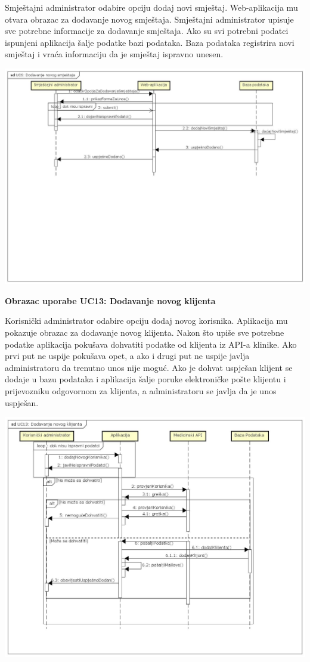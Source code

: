 			Smještajni administrator odabire opciju dodaj novi smještaj. Web-aplikacija mu otvara obrazac za dodavanje novog smještaja. Smještajni administrator upisuje sve potrebne informacije za dodavanje smještaja. Ako su svi potrebni podatci ispunjeni aplikacija šalje podatke bazi podataka. Baza podataka registrira novi smještaj i vraća informaciju da je smještaj ispravno unesen.
			{
			\begin{center} 
			\includegraphics[scale=0.32]{./dijagrami/sec_uc6}
			\end{center}
			}
			\eject
			
						
			\textbf{Obrazac uporabe UC13: Dodavanje novog klijenta}
			
			Korisnički administrator odabire opciju dodaj novog korisnika. Aplikacija mu pokazuje obrazac za dodavanje novog klijenta. Nakon što upiše sve potrebne podatke aplikacija pokušava dohvatiti podatke od klijenta iz API-a klinike. Ako prvi put ne uspije pokušava opet, a ako i drugi put ne uspije javlja administratoru da trenutno unos nije moguć. Ako je dohvat uspješan klijent se dodaje u bazu podataka i aplikacija šalje poruke elektroničke pošte klijentu i prijevozniku odgovornom za klijenta, a administratoru se javlja da je unos uspješan.
			{
			\begin{center}
			\includegraphics[scale=0.35]{./dijagrami/sec_uc13}
			\end{center}
			}
			\eject
			
